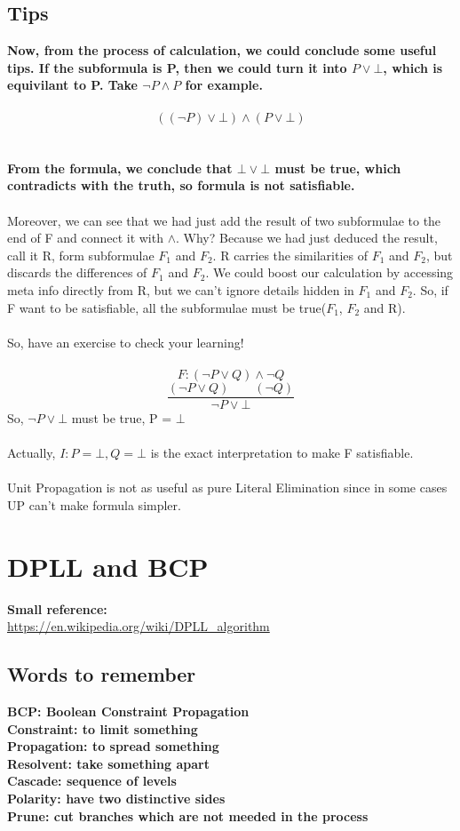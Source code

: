 \documentclass{article}
\begin{document}
\subsection{Tips}
\textbf{Now, from the process of calculation, we could conclude some useful tips. If the subformula is P, then we could turn it into $P \lor \bot$, which is equivilant to P. Take $\neg P \land P$ for example.}\\\\
$$((\neg P) \lor \bot) \land (P \lor \bot)$$\\\\
\textbf{From the formula, we conclude that $\bot \lor \bot$ must be true, which contradicts with the truth, so formula is not satisfiable.}\\\\
Moreover, we can see that we had just add the result of two subformulae to the end of F and connect it with $\land$. Why? Because we had just deduced the result, call it R, form subformulae $F_1$ and $F_2$. R carries the similarities of $F_1$ and $F_2$, but discards the differences of $F_1$ and $F_2$. We could boost our calculation by accessing meta info directly from R, but we can't ignore details hidden in $F_1$ and $F_2$. So, if F want to be satisfiable, all the subformulae must be true($F_1$, $F_2$ and R).\\\\
So, have an exercise to check your learning!\\\\
$$F: (\neg P \lor Q) \land \neg Q$$
$$\frac{(\neg P \lor Q) \qquad (\neg Q)}{\neg P \lor \bot}$$
So, $\neg P \lor \bot$ must be true, P = $\bot$\\\\
Actually, $I: {P = \bot, Q = \bot}$ is the exact interpretation to make F satisfiable.\\\\
Unit Propagation is not as useful as pure Literal Elimination since in some cases UP can't make formula simpler.

\section{DPLL and BCP}
\textbf{Small reference:}\\
\url{https://en.wikipedia.org/wiki/DPLL_algorithm}

\subsection{Words to remember}
\textbf{BCP: Boolean Constraint Propagation}\\
\textbf{Constraint: to limit something}\\
\textbf{Propagation: to spread something}\\
\textbf{Resolvent: take something apart}\\
\textbf{Cascade: sequence of levels}\\
\textbf{Polarity: have two distinctive sides}\\
\textbf{Prune: cut branches which are not meeded in the process}
\end{document}
